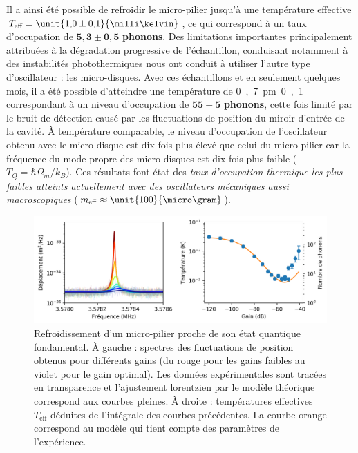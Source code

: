 \documentclass[12pt,a4paper]{article}
\begin{document}
Il a ainsi été possible de refroidir le micro-pilier jusqu'à une température effective $T_\mathrm{eff} = \unit{1{,}0\pm 0{,}1}{\milli\kelvin}$, ce qui correspond à un taux d'occupation de $\mathbf{5{,}3 \pm 0{,}5}$ \textbf{phonons}.
Des limitations importantes principalement attribuées à la dégradation progressive de l'échantillon, conduisant notamment à des instabilités photothermiques nous ont conduit à utiliser l'autre type d'oscillateur : les micro-disques.
Avec ces échantillons et en seulement quelques mois, il a été possible d'atteindre une température de \unit{0{,}7\pm 0{,}1}{\milli\kelvin} correspondant à un niveau d'occupation de $\mathbf{55\pm5}$ \textbf{phonons}, cette fois limité par le bruit de détection causé par les fluctuations de position du miroir d'entrée de la cavité.
À température comparable, le niveau d'occupation de l'oscillateur obtenu avec le micro-disque est dix fois plus élevé que celui du micro-pilier car la fréquence du mode propre des micro-disques est dix fois plus faible ($T_Q = \hbar\Omega_m/k_B$).
Ces résultats font état des \textit{taux d'occupation thermique les plus faibles atteints actuellement avec des oscillateurs mécaniques aussi macroscopiques} ($m_\mathrm{eff}\approx\unit{100}{\micro\gram}$). 

\begin{figure}
\center
\includegraphics[scale=0.75]{figures/feedback_cooling_6phonons.png}
\caption{Refroidissement d'un micro-pilier proche de son état quantique fondamental.
À gauche : spectres des fluctuations de position obtenus pour différents gains (du rouge pour les gains faibles au violet pour le gain optimal).
Les données expérimentales sont tracées en transparence et l'ajustement lorentzien par le modèle théorique correspond aux courbes pleines.
À droite : températures effectives $T_\mathrm{eff}$ déduites de l'intégrale des courbes précédentes.
La courbe orange correspond au modèle qui tient compte des paramètres de l'expérience.}
\label{fig:feedback_cooling_pillar}
\end{figure}
\end{document}
